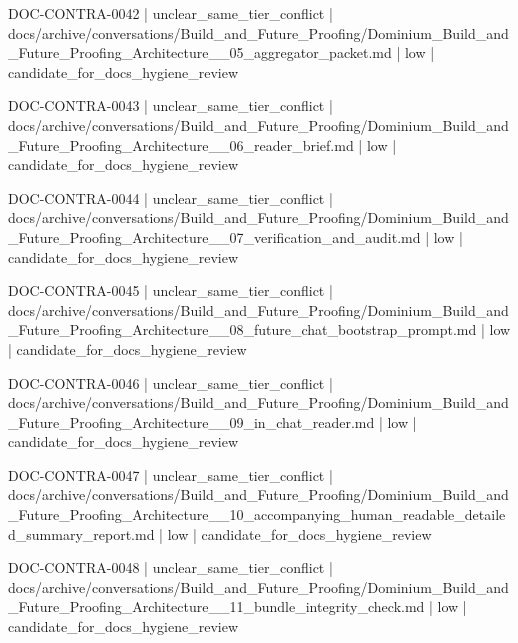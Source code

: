 \documentclass[11pt,a4paper]{report}
\begin{document}
{\small\ttfamily\raggedright DOC-\allowbreak{}CONTRA-\allowbreak{}0042 | unclear\_same\_tier\_conflict | docs/\allowbreak{}archive/\allowbreak{}conversations/\allowbreak{}Build\_and\_Future\_Proofing/\allowbreak{}Dominium\_Build\_and\_Future\_Proofing\_Architecture\_\_05\_aggregator\_packet.\allowbreak{}md | low | candidate\_for\_docs\_hygiene\_review\par}
{\small\ttfamily\raggedright DOC-\allowbreak{}CONTRA-\allowbreak{}0043 | unclear\_same\_tier\_conflict | docs/\allowbreak{}archive/\allowbreak{}conversations/\allowbreak{}Build\_and\_Future\_Proofing/\allowbreak{}Dominium\_Build\_and\_Future\_Proofing\_Architecture\_\_06\_reader\_brief.\allowbreak{}md | low | candidate\_for\_docs\_hygiene\_review\par}
{\small\ttfamily\raggedright DOC-\allowbreak{}CONTRA-\allowbreak{}0044 | unclear\_same\_tier\_conflict | docs/\allowbreak{}archive/\allowbreak{}conversations/\allowbreak{}Build\_and\_Future\_Proofing/\allowbreak{}Dominium\_Build\_and\_Future\_Proofing\_Architecture\_\_07\_verification\_and\_audit.\allowbreak{}md | low | candidate\_for\_docs\_hygiene\_review\par}
{\small\ttfamily\raggedright DOC-\allowbreak{}CONTRA-\allowbreak{}0045 | unclear\_same\_tier\_conflict | docs/\allowbreak{}archive/\allowbreak{}conversations/\allowbreak{}Build\_and\_Future\_Proofing/\allowbreak{}Dominium\_Build\_and\_Future\_Proofing\_Architecture\_\_08\_future\_chat\_bootstrap\_prompt.\allowbreak{}md | low | candidate\_for\_docs\_hygiene\_review\par}
{\small\ttfamily\raggedright DOC-\allowbreak{}CONTRA-\allowbreak{}0046 | unclear\_same\_tier\_conflict | docs/\allowbreak{}archive/\allowbreak{}conversations/\allowbreak{}Build\_and\_Future\_Proofing/\allowbreak{}Dominium\_Build\_and\_Future\_Proofing\_Architecture\_\_09\_in\_chat\_reader.\allowbreak{}md | low | candidate\_for\_docs\_hygiene\_review\par}
{\small\ttfamily\raggedright DOC-\allowbreak{}CONTRA-\allowbreak{}0047 | unclear\_same\_tier\_conflict | docs/\allowbreak{}archive/\allowbreak{}conversations/\allowbreak{}Build\_and\_Future\_Proofing/\allowbreak{}Dominium\_Build\_and\_Future\_Proofing\_Architecture\_\_10\_accompanying\_human\_readable\_detailed\_summary\_report.\allowbreak{}md | low | candidate\_for\_docs\_hygiene\_review\par}
{\small\ttfamily\raggedright DOC-\allowbreak{}CONTRA-\allowbreak{}0048 | unclear\_same\_tier\_conflict | docs/\allowbreak{}archive/\allowbreak{}conversations/\allowbreak{}Build\_and\_Future\_Proofing/\allowbreak{}Dominium\_Build\_and\_Future\_Proofing\_Architecture\_\_11\_bundle\_integrity\_check.\allowbreak{}md | low | candidate\_for\_docs\_hygiene\_review\par}
\end{document}
